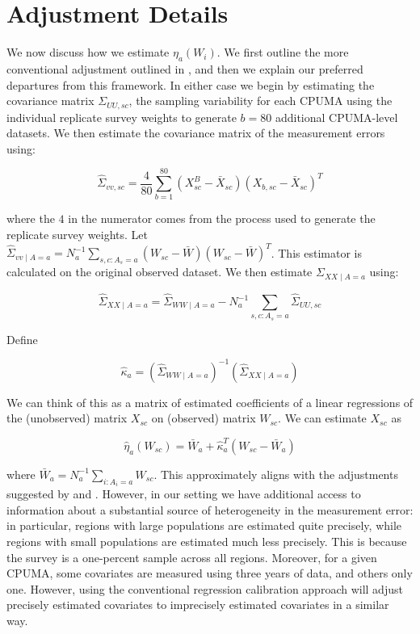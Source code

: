 \section{Adjustment Details}

We now discuss how we estimate $\eta_a(W_i)$. We first outline the more conventional adjustment outlined in \cite{carroll2006measurement}, and then we explain our preferred departures from this framework. In either case we begin by estimating the covariance matrix $\Sigma_{UU, sc}$, the sampling variability for each CPUMA using the individual replicate survey weights to generate $b = 80$ additional CPUMA-level datasets. We then estimate the covariance matrix of the measurement errors using:

$$
\hat{\Sigma}_{vv, sc} = \frac{4}{80}\sum_{b=1}^{80}(X_{sc}^B - \bar{X}_{sc})(X_{b, sc} - \bar{X}_{sc})^T
$$

where the $4$ in the numerator comes from the process used to generate the replicate survey weights. Let $\hat{\Sigma}_{vv \mid A = a} = N_a^{-1}\sum_{s, c: A_s = a} (W_{sc} - \bar{W})(W_{sc} - \bar{W})^T$. This estimator is calculated on the original observed dataset. We then estimate $\Sigma_{XX \mid A = a}$ using:

$$
\hat{\Sigma}_{XX \mid A = a} = \hat{\Sigma}_{WW \mid A = a} - N_a^{-1}\sum_{s, c: A_s = a} \hat{\Sigma}_{UU, sc}
$$

Define

$$
\hat{\kappa}_a = (\hat{\Sigma}_{WW \mid A = a})^{-1}(\hat{\Sigma}_{XX \mid A = a})
$$

We can think of this as a matrix of estimated coefficients of a linear regressions of the (unobserved) matrix $X_{sc}$ on (observed) matrix $W_{sc}$. We can estimate $X_{sc}$ as

$$
\hat{\eta}_a(W_{sc}) = \bar{W}_a + \hat{\kappa}_a^T(W_{sc} - \bar{W}_a)
$$

where $\bar{W}_a = N_a^{-1}\sum_{i: A_i = a} W_{sc}$. This approximately aligns with the adjustments suggested by \cite{carroll2006measurement} and \cite{gleser1992importance}. However, in our setting we have additional access to information about a substantial source of heterogeneity in the measurement error: in particular, regions with large populations are estimated quite precisely, while regions with small populations are estimated much less precisely. This is because the survey is a one-percent sample across all regions. Moreover, for a given CPUMA, some covariates are measured using three years of data, and others only one. However, using the conventional regression calibration approach will adjust precisely estimated covariates to imprecisely estimated covariates in a similar way. 


